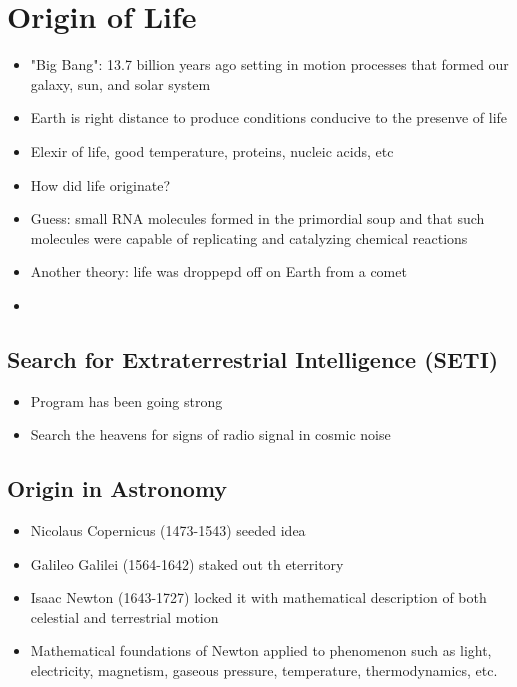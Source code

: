 \documentclass{article}
\begin{document}
\section{Origin of Life}
\begin{itemize}
    \item "Big Bang": 13.7 billion years ago setting in motion processes that formed our galaxy, sun, and solar system
    \item Earth is right distance to produce conditions conducive to the presenve of life
    \item Elexir of life, good temperature, proteins, nucleic acids, etc
    \item How did life originate?
    \item Guess: small RNA molecules formed in the primordial soup and that such molecules were capable of replicating and catalyzing chemical reactions
    \item Another theory: life was droppepd off on Earth from a comet
    \item 
\end{itemize}

\subsection{Search for Extraterrestrial Intelligence (SETI)}
\begin{itemize}
    \item Program has been going strong 
    \item Search the heavens for signs of radio signal in cosmic noise
\end{itemize}

\subsection{Origin in Astronomy}
\begin{itemize}
    \item Nicolaus Copernicus (1473-1543) seeded idea
    \item Galileo Galilei (1564-1642) staked out th eterritory
    \item Isaac Newton (1643-1727) locked it with mathematical description of both celestial and terrestrial motion
    \item Mathematical foundations of Newton applied to phenomenon such as light, electricity, magnetism, gaseous pressure, temperature, thermodynamics, etc. 
\end{itemize}
\end{document}
